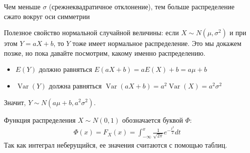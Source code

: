 \documentclass[12pt]{article}
\DeclareMathOperator{\Var}{Var}
\begin{document}
  Чем меньше $\sigma$ (срежнеквадратичное отклонение), тем больше распределение сжато вокруг оси симметрии
  \begin{center}
  \end{center}

  Полезное свойство нормальной случайной величины: если $X\sim N(\mu, \sigma^2)$ и при этом $Y = aX + b$, то $Y$ тоже имеет нормальное распределение. Это мы докажем позже, но пока давайте посмотрим, какому именно распределению.

  \begin{itemize}
    \item $E(Y)$ должно равняться $E(aX + b) = aE(X) + b = a\mu + b$
    \item $\Var(Y)$ должна равняться $\Var(aX + b) = a^2\Var(X) = a^2 \sigma^2$
  \end{itemize}
  Значит, $Y \sim N(a\mu + b, a^2\sigma^2)$.

  Функция распределения $X \sim N(0, 1)$ обозначается буквой $\Phi$:
  \begin{align*}
    \Phi(x) = F_X(x) = \int_{-\infty}^x \frac{1}{\sqrt{2\pi}}e^{-\frac{t^2}{2}} dt
  \end{align*}
  Так как интеграл неберущийся, ее значения считаются с помощью таблиц.
\end{document}

